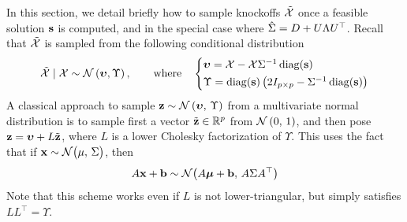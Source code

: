 In this section, we detail briefly how to sample knockoffs $\tilde{\mathcal{X}}$ once
a feasible solution $\mathbf{s}$ is computed,
and in the special case where $\hat{\Sigma} = D + U\Lambda U^\top$.
Recall that $\tilde{\mathcal{X}}$ is sampled from the following conditional distribution
\begin{equation}\label{eq:conditional_gaussian_knockoffs3}
    \tcX \mid \cX \sim \cN\left( \bupsilon, \Upsilon \right)
    ,\qquad\text{where}\quad
    \begin{cases*}
        \bupsilon = \cX - \cX\Sigma^{-1}\diag(\bs)\\
        \Upsilon = \diag(\bs)\left( 2I_{p \times p} - \Sigma^{-1}\diag(\bs) \right)
    \end{cases*}
\end{equation}
A classical approach to sample
$\mathbf{z} \sim \mathcal{N}\left( \bm{\upsilon},\, \Upsilon \right)$
from a multivariate normal distribution is to sample first a vector
$\tilde{\mathbf{z}} \in \mathbb{R}^p$ from $\mathcal{N}\left( 0,\, 1 \right)$,
and then pose $\mathbf{z} = \bm{\upsilon} + L\tilde{\mathbf{z}}$,
where $L$ is a lower Cholesky factorization of $\Upsilon$.
This uses the fact that if $\mathbf{x} \sim \mathcal{N}\big( \mu,\, \Sigma \big)$,
then
\begin{equation}\label{eq:affine_transformation}
    A\mathbf{x} + \mathbf{b} \sim \mathcal{N}\big( A\bm{\mu} + \mathbf{b},\, A\Sigma A^\top \big)
\end{equation}
Note that this scheme works even if $L$ is not lower-triangular,
but simply satisfies $LL^\top = \Upsilon$.

